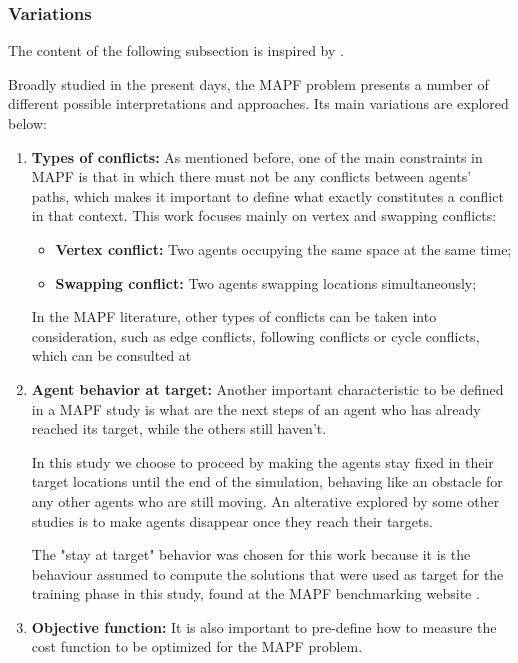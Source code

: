 \subsubsection{Variations}

The content of the following subsection is inspired by \cite{sternMultiAgentPathfindingDefinitions2019}.

Broadly studied in the present days, the MAPF problem presents a number of different possible interpretations and approaches. Its main variations are explored below:

\begin{enumerate}
    \item \textbf{Types of conflicts: } As mentioned before, one of the main constraints in MAPF is that in which there must not be any conflicts between agents' paths, which makes it important to define what exactly constitutes a conflict in that context.
    This work focuses mainly on vertex and swapping conflicts:
    \begin{itemize}
        \item \textbf{Vertex conflict:} Two agents occupying the same space at the same time;
        \item \textbf{Swapping conflict:} Two agents swapping locations simultaneously;
    \end{itemize}
    In the MAPF literature, other types of conflicts can be taken into consideration, such as edge conflicts, following conflicts or cycle conflicts, which can be consulted at \cite{liAnytimeMultiAgentPath2021}
    \item \textbf{Agent behavior at target:} Another important characteristic to be defined in a MAPF study is what are the next steps of an agent who has already reached its target, while the others still haven't.

    In this study we choose to proceed by making the agents stay fixed in their target locations until the end of the simulation, behaving like an obstacle for any other agents who are still moving. An alterative explored by some other studies is to make agents disappear once they reach their targets.

    The "stay at target" behavior was chosen for this work because it is the behaviour assumed to compute the solutions that were used as target for the training phase in this study, found at the MAPF benchmarking website \cite{shenTrackingProgressMultiAgent2023}.
    \item \textbf{Objective function: } It is also important to pre-define how to measure the cost function to be optimized for the MAPF problem.


\end{enumerate}
